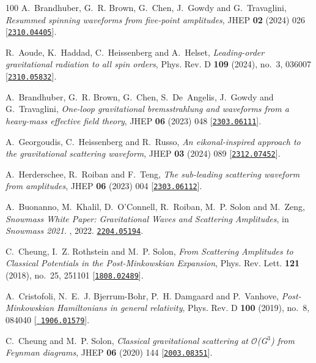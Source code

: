 \begin{thebibliography}{100}
A.~Brandhuber, G.~R. Brown, G.~Chen, J.~Gowdy and G.~Travaglini,  {\em
  {Resummed spinning waveforms from five-point amplitudes}}, JHEP {\bf 02}
  (2024) 026 [\href{http://www.arXiv.org/abs/2310.04405}{{\tt 2310.04405}}].

R.~Aoude, K.~Haddad, C.~Heissenberg and A.~Helset,  {\em {Leading-order
  gravitational radiation to all spin orders}}, Phys. Rev. D {\bf 109} (2024),
  no.~3, 036007 [\href{http://www.arXiv.org/abs/2310.05832}{{\tt 2310.05832}}].

A.~Brandhuber, G.~R. Brown, G.~Chen, S.~De~Angelis, J.~Gowdy and G.~Travaglini,
   {\em {One-loop gravitational bremsstrahlung and waveforms from a heavy-mass
  effective field theory}}, JHEP {\bf 06} (2023) 048
  [\href{http://www.arXiv.org/abs/2303.06111}{{\tt 2303.06111}}].

A.~Georgoudis, C.~Heissenberg and R.~Russo,  {\em {An eikonal-inspired approach
  to the gravitational scattering waveform}}, JHEP {\bf 03} (2024) 089
  [\href{http://www.arXiv.org/abs/2312.07452}{{\tt 2312.07452}}].

A.~Herderschee, R.~Roiban and F.~Teng,  {\em {The sub-leading scattering
  waveform from amplitudes}}, JHEP {\bf 06} (2023) 004
  [\href{http://www.arXiv.org/abs/2303.06112}{{\tt 2303.06112}}].

A.~Buonanno, M.~Khalil, D.~O'Connell, R.~Roiban, M.~P. Solon and M.~Zeng,  {\em
  {Snowmass White Paper: Gravitational Waves and Scattering Amplitudes}}, in
  {\em {Snowmass 2021}}.
, 2022.
\newblock \href{http://www.arXiv.org/abs/2204.05194}{{\tt 2204.05194}}.

C.~Cheung, I.~Z. Rothstein and M.~P. Solon,  {\em {From Scattering Amplitudes
  to Classical Potentials in the Post-Minkowskian Expansion}}, Phys. Rev. Lett.
  {\bf 121} (2018), no.~25, 251101
  [\href{http://www.arXiv.org/abs/1808.02489}{{\tt 1808.02489}}].

A.~Cristofoli, N.~E.~J. Bjerrum-Bohr, P.~H. Damgaard and P.~Vanhove,  {\em
  {Post-Minkowskian Hamiltonians in general relativity}}, Phys. Rev. D {\bf
  100} (2019), no.~8, 084040 [\href{http://www.arXiv.org/abs/1906.01579}{{\tt
  1906.01579}}].

C.~Cheung and M.~P. Solon,  {\em {Classical gravitational scattering at $
  \mathcal{O} $(G$^{3}$) from Feynman diagrams}}, JHEP {\bf 06} (2020) 144
  [\href{http://www.arXiv.org/abs/2003.08351}{{\tt 2003.08351}}].


\end{thebibliography}
